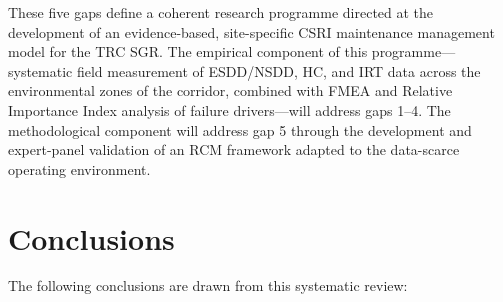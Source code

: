 \documentclass[preprint,12pt,3p]{elsarticle}
\begin{document}
These five gaps define a coherent research programme directed at
the development of an evidence-based, site-specific CSRI maintenance
management model for the TRC SGR. The empirical component of this
programme---systematic field measurement of ESDD/NSDD, HC, and
IRT data across the environmental zones of the corridor, combined
with FMEA and Relative Importance Index analysis of failure
drivers---will address gaps 1--4. The methodological component will
address gap 5 through the development and expert-panel validation of
an RCM framework adapted to the data-scarce operating environment.


\section{Conclusions}
\label{sec:conclusions}

The following conclusions are drawn from this systematic review:
\end{document}
